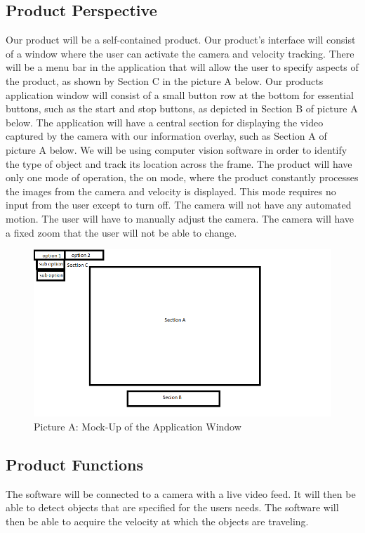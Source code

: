 \documentclass[letterpaper,10pt,onecolumn,draftclsnofoot]{IEEEtran}
\begin{document}
\subsection{Product Perspective}
Our product will be a self-contained product. 
Our product's interface will consist of a window where the user can activate the camera and velocity tracking.
There will be a menu bar in the application that will allow the user to specify aspects of the product, as shown by Section C in the picture A below.
Our products application window will consist of a small button row at the bottom for essential buttons, such as the start and stop buttons, as depicted in Section B of picture A below.
The application will have a central section for displaying the video captured by the camera with our information overlay, such as Section A of picture A below.
We will be using computer vision software in order to identify the type of object and track its location across the frame.
The product will have only one mode of operation, the on mode, where the product constantly processes the images from the camera and velocity is displayed.
This mode requires no input from the user except to turn off.
The camera will not have any automated motion.
The user will have to manually adjust the camera.
The camera will have a fixed zoom that the user will not be able to change.

\begin{figure}[h]
    \centering
    \includegraphics[scale=0.75]{cs_461_mock_up}
    \caption{Picture A: Mock-Up of the Application Window}
    \label{fig: pic_a}
\end{figure}


\subsection{Product Functions}
The software will be connected to a camera with a live video feed.
It will then be able to detect objects that are specified for the users needs.
The software will then be able to acquire the velocity at which the objects are traveling.
\end{document}
